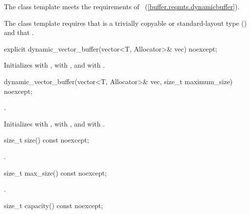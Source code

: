 \pnum
The  class template meets the requirements of ~(\ref{buffer.reqmts.dynamicbuffer}).

\pnum
The  class template requires that  is a trivially copyable or standard-layout type () and that .

%
\begin{itemdecl}
explicit dynamic_vector_buffer(vector<T, Allocator>& vec) noexcept;
\end{itemdecl}

\begin{itemdescr}
\pnum
\effects Initializes  with ,  with , and  with .
\end{itemdescr}

%
\begin{itemdecl}
dynamic_vector_buffer(vector<T, Allocator>& vec,
                      size_t maximum_size) noexcept;
\end{itemdecl}

\begin{itemdescr}
\pnum
\requires {}.

\pnum
\effects Initializes  with ,  with , and  with .
\end{itemdescr}

%
\begin{itemdecl}
size_t size() const noexcept;
\end{itemdecl}

\begin{itemdescr}
\pnum
\returns {}.
\end{itemdescr}

%
\begin{itemdecl}
size_t max_size() const noexcept;
\end{itemdecl}

\begin{itemdescr}
\pnum
\returns {}.
\end{itemdescr}

%
\begin{itemdecl}
size_t capacity() const noexcept;
\end{itemdecl}

